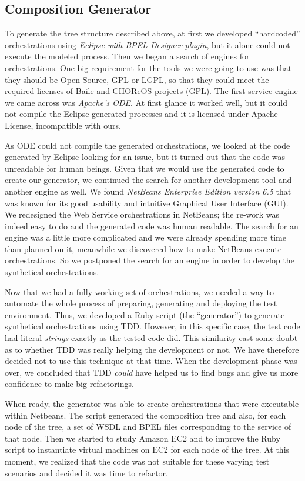 \subsection{Composition Generator}
To generate the tree structure described above, at first we developed ``hardcoded'' orchestrations using \emph{Eclipse with BPEL Designer plugin}, but it alone could not execute the modeled process. Then we began a search of engines for orchestrations. One big requirement for the tools we were going to use was that they should be Open Source, GPL or LGPL, so that they could meet the required licenses of Baile and CHOReOS projects (GPL). The first service engine we came across was \emph{Apache's ODE}. At first glance it worked well, but it could not compile the Eclipse generated processes and it is licensed under Apache License, incompatible with ours.

As ODE could not compile the generated orchestrations, we looked at the code generated by Eclipse looking for an issue, but it turned out that the code was unreadable for human beings. Given that we would use the generated code to create our generator, we continued the search for another development tool and another engine as well. We found \emph{NetBeans Enterprise Edition version 6.5} that was known for its good usability and intuitive Graphical User Interface (GUI). We redesigned the Web Service orchestrations in NetBeans; the re-work was indeed easy to do and the generated code was human readable. The search for an engine was a little more complicated and we were already spending more time than planned on it, meanwhile we discovered how to make NetBeans execute orchestrations. So we postponed the search for an engine in order to develop the synthetical orchestrations.

Now that we had a fully working set of orchestrations, we needed a way to automate the whole process of preparing, generating and deploying the test environment. Thus, we developed a Ruby script (the ``generator'') to generate synthetical orchestrations using TDD. However, in this specific case, the test code had literal \emph{strings} exactly as the tested code did. This similarity cast some doubt as to whether TDD was really helping the development or not. We have therefore decided not to use this technique at that time. When the development phase was over, we concluded that TDD \emph{could} have helped us to find bugs and give us more confidence to make big refactorings.

When ready, the generator was able to create orchestrations that were executable within Netbeans. The script generated the composition tree and also, for each node of the tree, a set of WSDL and BPEL files corresponding to the service of that node. Then we started to study Amazon EC2 and to improve the Ruby script to instantiate virtual machines on EC2 for each node of the tree. At this moment, we realized that the code was not suitable for these varying test scenarios and decided it was time to refactor.

